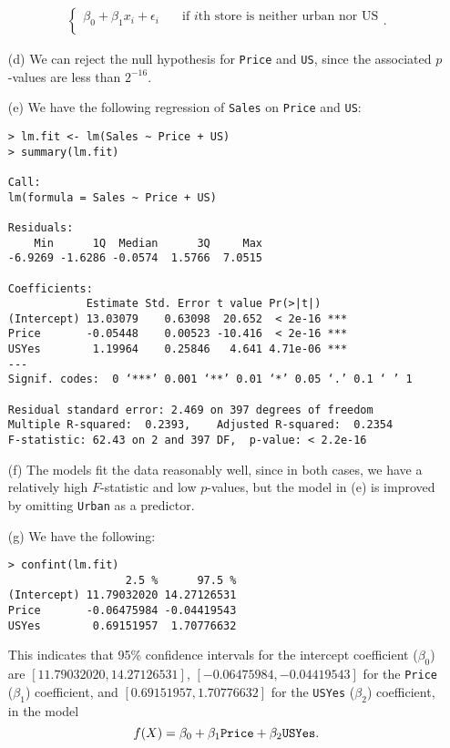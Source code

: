 \begin{itemize}
\begin{equation*}
\begin{split}
\begin{cases}
                    \beta_0 + \beta_1x_i + \epsilon_i \quad 
                        &\text{if $i$th store is neither urban nor US} \\
                \end{cases}.
            \end{split}
        \end{equation*}
    \item[(d)] We can reject the null hypothesis for \verb|Price| and \verb|US|, since 
        the associated $p$-values are less than $2^{-16}$.
    \item[(e)] We have the following regression of \verb|Sales| on \verb|Price| and
        \verb|US|:
        \small\begin{verbatim}
> lm.fit <- lm(Sales ~ Price + US)
> summary(lm.fit)

Call:
lm(formula = Sales ~ Price + US)

Residuals:
    Min      1Q  Median      3Q     Max 
-6.9269 -1.6286 -0.0574  1.5766  7.0515 

Coefficients:
            Estimate Std. Error t value Pr(>|t|)    
(Intercept) 13.03079    0.63098  20.652  < 2e-16 ***
Price       -0.05448    0.00523 -10.416  < 2e-16 ***
USYes        1.19964    0.25846   4.641 4.71e-06 ***
---
Signif. codes:  0 ‘***’ 0.001 ‘**’ 0.01 ‘*’ 0.05 ‘.’ 0.1 ‘ ’ 1

Residual standard error: 2.469 on 397 degrees of freedom
Multiple R-squared:  0.2393,    Adjusted R-squared:  0.2354 
F-statistic: 62.43 on 2 and 397 DF,  p-value: < 2.2e-16
        \end{verbatim}\normalsize
    \item[(f)] The models fit the data reasonably well, since in both cases, we 
        have a relatively high $F$-statistic and low $p$-values, but the model 
        in (e) is improved by omitting \verb|Urban| as a predictor.
    \item[(g)] We have the following:
        \small\begin{verbatim}
> confint(lm.fit)
                  2.5 %      97.5 %
(Intercept) 11.79032020 14.27126531
Price       -0.06475984 -0.04419543
USYes        0.69151957  1.70776632
        \end{verbatim}\normalsize
        This indicates that 95\% confidence intervals for the intercept coefficient 
        ($\beta_0$) are $[11.79032020,14.27126531]$, $[-0.06475984, -0.04419543]$ 
        for the \verb|Price| ($\beta_1$) coefficient, and $[0.69151957, 1.70776632]$ 
        for the \verb|USYes| ($\beta_2$) coefficient, in the model
        \[
            f(X) = \beta_0 + \beta_1\verb|Price| + \beta_2\verb|USYes|.
        \]
\end{itemize}

